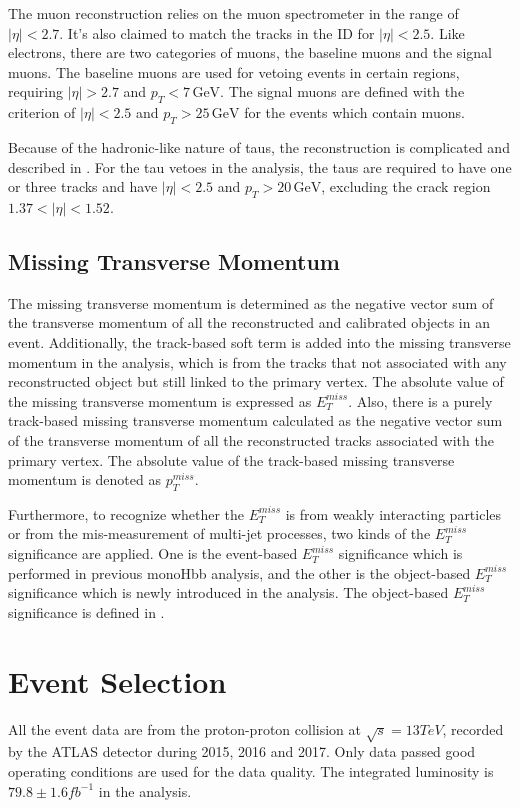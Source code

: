 \documentclass[class=NTHU_thesis, crop=false]{standalone}
\begin{document}
The muon reconstruction relies on the muon spectrometer in the range of $\left|\eta\right| < 2.7$. It's also claimed to match the tracks in the ID for $\left|\eta\right| < 2.5$. Like electrons, there are two categories of muons, the baseline muons and the signal muons. The baseline muons are used for vetoing events in certain regions, requiring $\left|\eta\right| > 2.7$ and $p_T < 7\, \mathrm{GeV}$. The signal muons are defined with the criterion of $\left|\eta\right| < 2.5$ and $p_T > 25\, \mathrm{GeV}$ for the events which contain muons.

Because of the hadronic-like nature of taus, the reconstruction is complicated and described in \cite{ATLAS-CONF-2017-029}. For the tau vetoes in the analysis, the taus are required to have one or three tracks and have $\left|\eta\right| < 2.5$ and $p_T > 20\, \mathrm{GeV}$, excluding the crack region $1.37 < \left|\eta\right| < 1.52$.

\subsection{Missing Transverse Momentum}
The missing transverse momentum is determined as the negative vector sum of the transverse momentum of all the reconstructed and calibrated objects in an event. Additionally, the track-based soft term is added into the missing transverse momentum in the analysis, which is from the tracks that not associated with any reconstructed object but still linked to the primary vertex. The absolute value of the missing transverse momentum is expressed as $E^{miss}_T$. Also, there is a purely track-based missing transverse momentum calculated as the negative vector sum of the transverse momentum of all the reconstructed tracks associated with the primary vertex. The absolute value of the track-based missing transverse momentum is denoted as $p^{miss}_T$.

Furthermore, to recognize whether the $E^{miss}_T$ is from weakly interacting particles or from the mis-measurement of multi-jet processes, two kinds of the $E^{miss}_T$ significance are applied. One is the event-based $E^{miss}_T$ significance which is performed in previous monoHbb analysis, and the other is the object-based $E^{miss}_T$ significance which is newly introduced in the analysis. The object-based $E^{miss}_T$ significance is defined in \cite{ATLAS-CONF-2018-038}.

\section{Event Selection}
All the event data are from the proton-proton collision at $\sqrt{s} = 13 TeV$, recorded by the ATLAS detector during 2015, 2016 and 2017. Only data passed good operating conditions are used for the data quality. The integrated luminosity is $79.8 \pm 1.6 fb^{-1}$ in the analysis.
\end{document}
